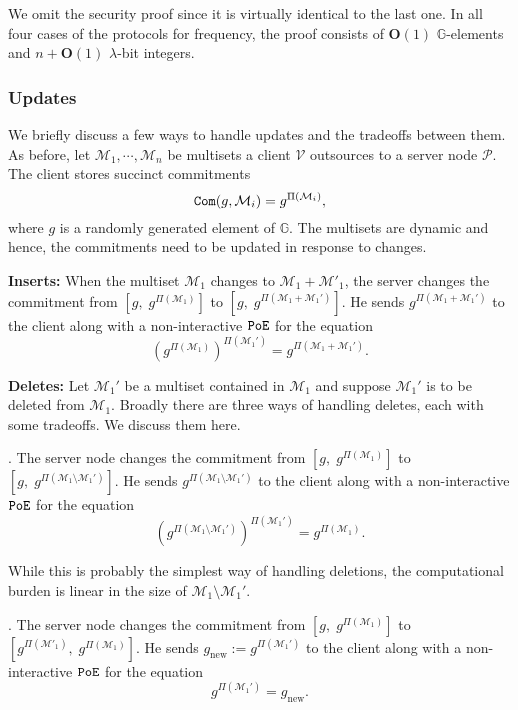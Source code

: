 \documentclass[11pt, lettersize, notitlepage, leqno, footskip=0.6cm]{article}
\newcommand{\ttt}{\texttt}
\newcommand{\bG}{\mathbb{G}}
\newcommand{\pr}{\protect}
\newcommand{\mc}{\mathcal}
\newcommand{\mbf}{\mathbf}
\newcommand{\mr}{\mathrm}
\newcommand{\sm}{\setminus}
\newcommand{\lam}{\lambda}
\newcommand{\bO}{\mbf{O}}
\newcommand{\mP}{\mc{P}}
\newcommand{\V}{\mc{V}}
\newcommand{\vs}{\vspace{-0.15cm}}
\newcommand{\noin}{\noindent}
\numberwithin{equation}{section}
\begin{document}
\noin We omit the security proof since it is virtually identical to the last one. In all four cases of the protocols for frequency, the proof consists of $\bO(1)$ $\bG$-elements and $n+\bO(1)$ $\lam$-bit integers.


\subsubsection{\fontsize{11}{11}\selectfont Updates}

We briefly discuss a few ways to handle updates and the tradeoffs between them. As before, let $\mc{M}_1,\cdots, \mc{M}_n$ be multisets a client $\V$ outsources to a server node $\mP$. The client stores succinct commitments \vs $$\pr{\ttt{Com}}(g, \mc{M}_i) = g^{\Pi(\mc{M}_i)},$$ where $g$ is a randomly generated element of $\bG$. The multisets are dynamic and hence, the commitments need to be updated in response to changes. \vspace{0.15cm}

\noin \textbf{Inserts:} When the multiset $\mc{M}_1$ changes to $\mc{M}_1+\mc{M}'_1$, the server changes the commitment from $[g,\; g^{\Pi(\mc{M}_1)}]$ to $[g,\;g^{\Pi(\mc{M}_1+\mc{M}_1')}]$. He sends $g^{\Pi(\mc{M}_1+\mc{M}_1')}$ to the client along with a non-interactive $\tt{PoE}$ for the equation \vs $$(g^{\Pi(\mc{M}_1)})^{\Pi(\mc{M}_1')} =   g^{\Pi(\mc{M}_1+\mc{M}_1')}.$$  

\noin \textbf{Deletes:} Let $\mc{M}_1'$ be a multiset contained in $\mc{M}_1$ and suppose $\mc{M}_1'$ is to be deleted from $\mc{M}_1$. Broadly there are three ways of handling deletes, each with some tradeoffs. We discuss them here. \vspace{0.1cm}

\noin 1. The server node changes the commitment from $[g,\; g^{\Pi(\mc{M}_1)}]$ to $[g,\;g^{\Pi(\mc{M}_1\sm\mc{M}_1')}]$. He sends $g^{\Pi(\mc{M}_1\sm\mc{M}_1')}$ to the client along with a non-interactive $\tt{PoE}$ for the equation \vs $$(g^{\Pi(\mc{M}_1\sm\mc{M}_1')})^{\Pi(\mc{M}_1')} =   g^{\Pi(\mc{M}_1)}.$$

While this is probably the simplest way of handling deletions, the computational burden is linear in the size of $\mc{M}_1\sm\mc{M}_1'$.
\vspace{0.1cm}

\noin 2. The server node changes the commitment from $[g,\; g^{\Pi(\mc{M}_1)}]$ to $[g^{\Pi(\mc{M}'_1)},\; g^{\Pi(\mc{M}_1)}]$. He sends $g_{\mr{new}}:= g^{\Pi(\mc{M}_1')}$ to the client along with a non-interactive $\tt{PoE}$ for the equation \vs $$g^{\Pi(\mc{M}_1')} =   g_{\mr{new}}.$$
\end{document}
